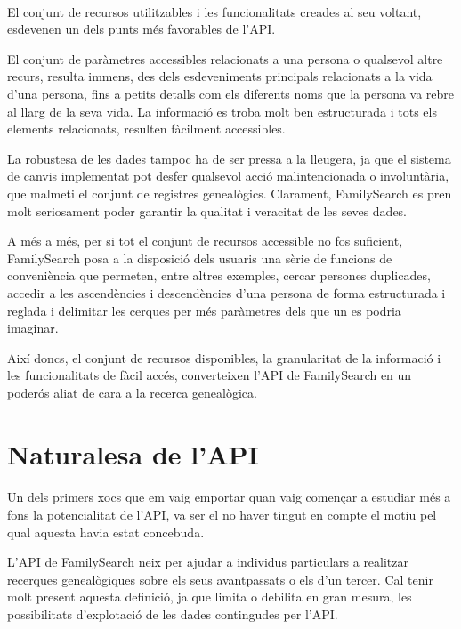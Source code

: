     \paragraph{}
    El conjunt de recursos utilitzables i les funcionalitats creades al seu voltant, esdevenen un dels punts més favorables de l'API.

    El conjunt de paràmetres accessibles relacionats a una persona o qualsevol altre recurs, resulta immens, des dels esdeveniments principals relacionats a la vida d'una persona, fins a petits detalls com els diferents noms que la persona va rebre al llarg de la seva vida. La informació es troba molt ben estructurada i tots els elements relacionats, resulten fàcilment accessibles.

    La robustesa de les dades tampoc ha de ser pressa a la lleugera, ja que el sistema de canvis implementat pot desfer qualsevol acció malintencionada o involuntària, que malmeti el conjunt de registres genealògics. Clarament, FamilySearch es pren molt seriosament poder garantir la qualitat i veracitat de les seves dades.

    A més a més, per si tot el conjunt de recursos accessible no fos suficient, Family\-Search posa a la disposició dels usuaris una sèrie de funcions de conveniència que permeten, entre altres exemples, cercar persones duplicades, accedir a les ascendències i descendències d'una persona de forma estructurada i reglada i delimitar les cerques per més paràmetres dels que un es podria imaginar.

    Així doncs, el conjunt de recursos disponibles, la granularitat de la informació i les funcionalitats de fàcil accés, converteixen l'API de FamilySearch en un poderós aliat de cara a la recerca genealògica.


\section{Naturalesa de l'API}

    \paragraph{}
    Un dels primers xocs que em vaig emportar quan vaig començar a estudiar més a fons la potencialitat de l'API, va ser el no haver tingut en compte el motiu pel qual aquesta havia estat concebuda.

    L'API de FamilySearch neix per ajudar a individus particulars a realitzar recerques genealògiques sobre els seus avantpassats o els d'un tercer. Cal tenir molt present aquesta definició, ja que limita o debilita en gran mesura, les possibilitats d'explotació de les dades contingudes per l'API.


